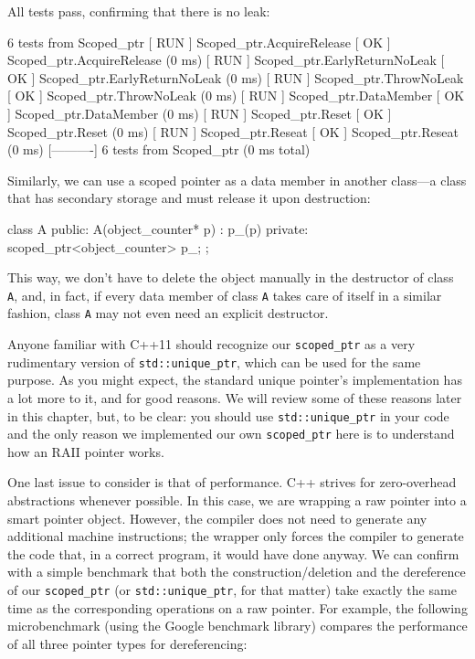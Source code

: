 All tests pass, confirming that there is no leak:

\begin{code}
[----------] 6 tests from Scoped_ptr
[ RUN      ] Scoped_ptr.AcquireRelease
[       OK ] Scoped_ptr.AcquireRelease (0 ms)
[ RUN      ] Scoped_ptr.EarlyReturnNoLeak
[       OK ] Scoped_ptr.EarlyReturnNoLeak (0 ms)
[ RUN      ] Scoped_ptr.ThrowNoLeak
[       OK ] Scoped_ptr.ThrowNoLeak (0 ms)
[ RUN      ] Scoped_ptr.DataMember
[       OK ] Scoped_ptr.DataMember (0 ms)
[ RUN      ] Scoped_ptr.Reset
[       OK ] Scoped_ptr.Reset (0 ms)
[ RUN      ] Scoped_ptr.Reseat
[       OK ] Scoped_ptr.Reseat (0 ms)
[----------] 6 tests from Scoped_ptr (0 ms total)
\end{code}

Similarly, we can use a scoped pointer as a data member in another class---a class that has secondary storage and must release it upon destruction:

\begin{code}
class A {
  public:
  A(object_counter* p) : p_(p) {}
  private:
  scoped_ptr<object_counter> p_;
};
\end{code}

This way, we don't have to delete the object manually in the destructor of class \texttt{A}, and, in fact, if every data member of class \texttt{A} takes care of itself in a similar fashion, class \texttt{A} may not even need an explicit destructor.

Anyone familiar with C++11 should recognize our \texttt{scoped\_ptr} as a very rudimentary version of \texttt{std::unique\_ptr}, which can be used for the same purpose. As you might expect, the standard unique pointer's implementation has a lot more to it, and for good reasons. We will review some of these reasons later in this chapter, but, to be clear: you should use \texttt{std::unique\_ptr} in your code and the only reason we implemented our own \texttt{scoped\_ptr} here is to understand how an RAII pointer works.

One last issue to consider is that of performance. C++ strives for zero-overhead abstractions whenever possible. In this case, we are wrapping a raw pointer into a smart pointer object. However, the compiler does not need to generate any additional machine instructions; the wrapper only forces the compiler to generate the code that, in a correct program, it would have done anyway. We can confirm with a simple benchmark that both the construction/deletion and the dereference of our \texttt{scoped\_ptr} (or \texttt{std::unique\_ptr}, for that matter) take exactly the same time as the corresponding operations on a raw pointer. For example, the following microbenchmark (using the Google benchmark library) compares the performance of all three pointer types for dereferencing:

